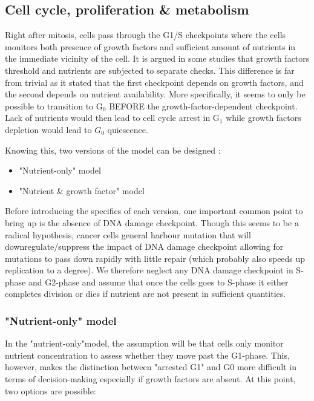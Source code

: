 \documentclass[11pt,a4paper]{article}
\begin{document}
\subsection{Cell cycle, proliferation \& metabolism}
Right after mitosis, cells pass through the  G1/S checkpoints where the cells monitors both presence of growth factors and sufficient amount of nutrients in the immediate vicinity of the cell. It is argued in some studies that growth factors threshold and nutrients are subjected to separate checks.\cite{Zetterberg1996}\cite{Foster2010} This difference is far from trivial as it stated that the first checkpoint depends on growth factors, and the second depends on nutrient availability. More specifically, it seems to only be possible to transition to G$_0$ BEFORE the growth-factor-dependent checkpoint. Lack of nutrients would then lead to cell cycle arrest in G$_1$ while growth factors depletion would lead to $G_0$ quiescence.

Knowing this, two versions of the model can be designed :
\begin{itemize}
\item "Nutrient-only" model 
\item "Nutrient \& growth factor" model
\end{itemize} 

Before introducing the specifics of each version, one important common point to bring up is the absence of DNA damage checkpoint. Though this seems to be a radical hypothesis, cancer cells general harbour mutation that will downregulate/suppress the impact of DNA damage checkpoint allowing for mutations to pass down rapidly with little repair (which probably also speeds up replication to a degree). We therefore neglect any DNA damage checkpoint in S-phase and G2-phase and assume that once the cells  goes to S-phase it either completes division or dies if nutrient are not present in sufficient quantities.

\subsubsection{"Nutrient-only" model}
In the "nutrient-only"model, the assumption will be that cells only monitor nutrient concentration to assess whether they move past the G1-phase. This, however, makes the distinction between "arrested G1" and G0 more difficult in terms of decision-making especially if growth factors are absent. At this point, two options are possible: 
\end{document}
